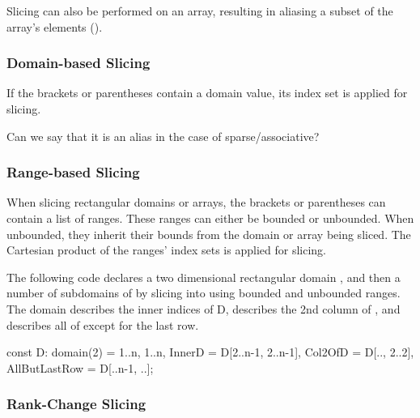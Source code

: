 Slicing can also be performed on an array,
resulting in aliasing a subset of the array's elements
().

\subsubsection{Domain-based Slicing}

If the brackets or parentheses contain a domain value,
its index set is applied for slicing.

\begin{openissue}
Can we say that it is an alias in the case of sparse/associative?
\end{openissue}

\subsubsection{Range-based Slicing}
\label{Range_Based_Slicing}
When slicing rectangular domains or arrays, the brackets or parentheses
can contain a list of  ranges.  These ranges can either be bounded
or unbounded.
%
When unbounded, they inherit their bounds from the
domain or array being sliced.
%
The Cartesian product of the ranges' index sets is applied for slicing.

\begin{example}
The following code declares a two dimensional rectangular
domain , and then a number of subdomains of  by
slicing into  using bounded and unbounded ranges.
The  domain describes the inner indices of
D,  describes the 2nd column of
, and  describes all of  except
for the last row.

\begin{chapel}
const D: domain(2) = {1..n, 1..n},
      InnerD = D[2..n-1, 2..n-1],
      Col2OfD = D[.., 2..2],
      AllButLastRow = D[..n-1, ..];
\end{chapel}
\end{example}

\subsubsection{Rank-Change Slicing}
\label{Rank_Change_Slicing}

